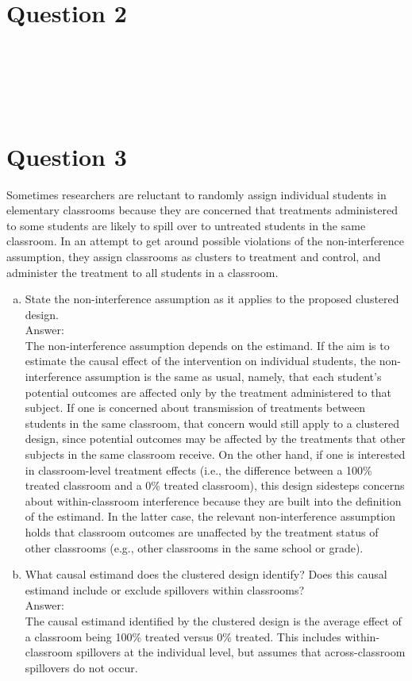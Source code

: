 \documentclass[11pt,notitlepage]{article}\usepackage[]{graphicx}\usepackage[]{color}
\makeatletter
\newenvironment{kframe}{%
 \def\at@end@of@kframe{}%
 \ifinner\ifhmode%
  \def\at@end@of@kframe{\end{minipage}}%
  \begin{minipage}{\columnwidth}%
 \fi\fi%
 \def\FrameCommand##1{\hskip\@totalleftmargin \hskip-\fboxsep
 \colorbox{shadecolor}{##1}\hskip-\fboxsep
     \hskip-\linewidth \hskip-\@totalleftmargin \hskip\columnwidth}%
 \MakeFramed {\advance\hsize-\width
   \@totalleftmargin\z@ \linewidth\hsize
   \@setminipage}}%
 {\par\unskip\endMakeFramed%
 \at@end@of@kframe}
\newenvironment{knitrout}{}{} %
\makeatother
\begin{document}
\section*{Question 2}
\begin{knitrout}
\color{fgcolor}\begin{kframe}
\begin{verbatim}






\end{verbatim}
\end{kframe}
\end{knitrout}


\section*{Question 3}
Sometimes researchers are reluctant to randomly assign individual students in elementary classrooms because they are concerned that treatments administered to some students are likely to spill over to untreated students in the same classroom. In an attempt to get around possible violations of the non-interference assumption, they assign classrooms as clusters to treatment and control, and administer the treatment to all students in a classroom.
\begin{enumerate}[a)]
\item State the non-interference assumption as it applies to the proposed clustered design. \\
Answer:\\
The non-interference assumption depends on the estimand. If the aim is to estimate the causal effect of the intervention on individual students, the non-interference assumption is the same as usual, namely, that each student's potential outcomes are affected only by the treatment administered to that subject. If one is concerned about transmission of treatments between students in the same classroom, that concern would still apply to a clustered design, since potential outcomes may be affected by the treatments that other subjects in the same classroom receive. On the other hand, if one is interested in classroom-level treatment effects (i.e., the difference between a 100\% treated classroom and a 0\% treated classroom), this design sidesteps concerns about within-classroom interference because they are built into the definition of the estimand. In the latter case, the relevant non-interference assumption holds that classroom outcomes are unaffected by the treatment status of other classrooms (e.g., other classrooms in the same school or grade).
\item What causal estimand does the clustered design identify? Does this causal estimand include or exclude spillovers within classrooms?\\
Answer:\\
The causal estimand identified by the clustered design is the average effect of a classroom being 100\% treated versus 0\% treated. This includes within-classroom spillovers at the individual level, but assumes that across-classroom spillovers do not occur.
\end{enumerate}
\end{document}
